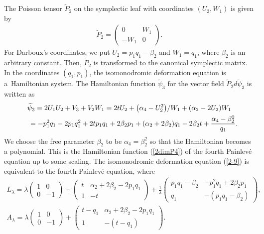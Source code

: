 \documentclass[pdftex]{sigma}
\numberwithin{equation}{section}
\begin{document}
The Poisson tensor $\widetilde{P}_2$ on the symplectic leaf with coordinates $(U_2,W_1)$ is given by
\begin{gather*}
\widetilde{P}_2 = \left(
\begin{matrix}
0 & W_1 \\
-W_1 & 0
\end{matrix}
\right).
\end{gather*}
For Darboux's coordinates, we put $U_2 = p_1q_1 - \beta_2$ and $W_1 = q_1$, where $\beta_2$ is an arbitrary constant. Then, $\widetilde{P}_2$ is transformed to the canonical symplectic matrix. In the coordinates $(q_1, p_1)$, the isomonodromic deformation equation is a~Hamiltonian system. The Hamiltonian function $\widetilde{\psi}_3$ for the vector f\/ield $\widetilde{P}_2d\widetilde{\psi}_3$ is written as
\begin{gather*}
\widetilde{\psi}_3 = 2U_1U_2 + V_3 + V_2W_1 = 2t U_2 + \big(\alpha _4-U_2^2\big)/W_1 + (\alpha _2 - 2U_2)W_1 \\
\hphantom{\widetilde{\psi}_3}{} = -p_1^2 q_1 - 2p_1q_1^2 + 2t p_1q_1 + 2\beta_2 p_1 + (\alpha _2 + 2\beta_2) q_1 - 2\beta_2 t + \frac{\alpha _4-\beta_2^2}{q_1}.
\end{gather*}
We choose the free parameter $\beta_2$ to be $\alpha _4 = \beta_2^2$ so that the Hamiltonian becomes a polynomial.
This is the Hamiltonian function (\ref{2dimP4}) of the fourth Painlev\'{e} equation up to some scaling.
The isomonodromic deformation equation (\ref{2-9}) is equivalent to the fourth Painlev\'{e} equation, where
\begin{gather*}
L_\lambda = \lambda \left(
\begin{matrix}
1 & 0 \\
0 & -1
\end{matrix}
\right) + \left(
\begin{matrix}
t & \alpha _2+2\beta_2 - 2p_1q_1 \\
1 & -t
\end{matrix}
\right) + \frac{1}{\lambda }\left(
\begin{matrix}
p_1q_1-\beta_2 & -p_1^2q_1+2\beta_2 p_1 \\
q_1 & -(p_1q_1-\beta_2)
\end{matrix}
\right), \\
A_\lambda = \lambda \left(
\begin{matrix}
1 & 0 \\
0 & -1
\end{matrix}
\right) + \left(
\begin{matrix}
t-q_1 & \alpha _2+2\beta_2 - 2p_1q_1 \\
1 & -(t-q_1)
\end{matrix}
\right).
\end{gather*}
\end{document}

